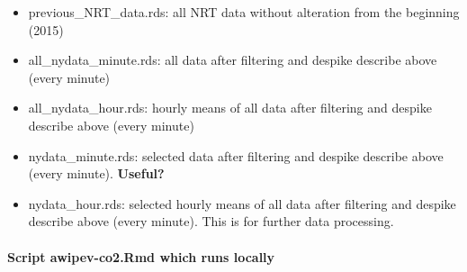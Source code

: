 \documentclass[
]{article}
\providecommand{\tightlist}{%
  \setlength{\itemsep}{0pt}\setlength{\parskip}{0pt}}
\begin{document}
\begin{itemize}
  \begin{itemize}
  \tightlist
  \item
    previous\_NRT\_data.rds: all NRT data without alteration from the
    beginning (2015)
  \item
    all\_nydata\_minute.rds: all data after filtering and despike
    describe above (every minute)
  \item
    all\_nydata\_hour.rds: hourly means of all data after filtering and
    despike describe above (every minute)
  \item
    nydata\_minute.rds: selected data after filtering and despike
    describe above (every minute). \textbf{Useful?}
  \item
    nydata\_hour.rds: selected hourly means of all data after filtering
    and despike describe above (every minute). This is for further data
    processing.
  \end{itemize}
\end{itemize}

\hypertarget{script-awipev-co2.rmd-which-runs-locally}{%
\paragraph{Script awipev-co2.Rmd which runs
locally}\label{script-awipev-co2.rmd-which-runs-locally}}
\end{document}
